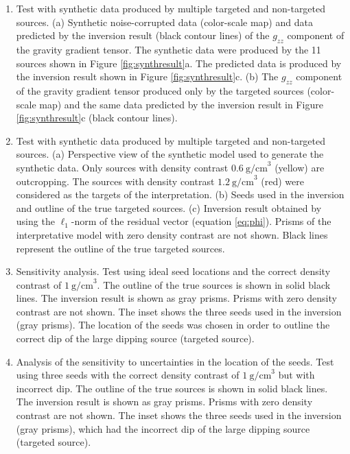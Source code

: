 \begin{enumerate}
\item \label{fig:synthdata}
    Test with synthetic data produced by multiple
    targeted and non-targeted sources.
    (a) Synthetic noise-corrupted data (color-scale map) and data
    predicted by the inversion result (black contour lines) of the
    $g_{zz}$ component of the gravity
    gradient tensor.
    The synthetic data were produced by the 11 sources shown in Figure
    \ref{fig:synthresult}a.
    The predicted data is produced by the inversion result shown in Figure
    \ref{fig:synthresult}c.
    (b) The $g_{zz}$ component of the gravity gradient tensor
    produced only by the targeted sources
    (color-scale map) and
    the same data predicted by the inversion
    result in Figure \ref{fig:synthresult}c (black contour lines).

\item \label{fig:synthresult}
    Test with synthetic data produced by multiple
    targeted and non-targeted sources. (a) Perspective view of the synthetic
    model used to generate the synthetic data. Only sources with density
    contrast $0.6\ \mathrm{g/cm}^3$ (yellow) are outcropping.
    The sources with density contrast $1.2\ \mathrm{g/cm}^3$ (red) were
    considered as the targets of the interpretation.
    (b) Seeds used in the inversion and outline of the true targeted sources.
    (c) Inversion result obtained by using the $\ell_1$-norm of the residual
    vector (equation \ref{eq:phi}).
    Prisms of the interpretative model with zero density contrast are not
    shown. Black lines represent the outline of the true targeted sources.

\item \label{fig:fullseeds}
    Sensitivity analysis.
    Test using ideal seed locations and the correct density contrast of
    $1\ \mathrm{g/cm}^3$.
    The outline of the true sources is shown in solid black lines.
    The inversion result is shown as gray prisms.
    Prisms with zero density contrast are not shown.
    The inset shows the three seeds used in the inversion (gray prisms).
    The location of the seeds was chosen
    in order to outline the correct dip of
    the large dipping source (targeted source).
    
\item \label{fig:wrongseeds}
    Analysis of the sensitivity to uncertainties in the location of the seeds.
    Test using three seeds with the correct density contrast of
    $1\ \mathrm{g/cm}^3$ but with incorrect dip.
    The outline of the true sources is shown in solid black lines.
    The inversion result is shown as gray prisms.
    Prisms with zero density contrast are not shown.
    The inset shows the three seeds used in the inversion (gray prisms),
    which had the incorrect dip of
    the large dipping source (targeted source).


\end{enumerate}
